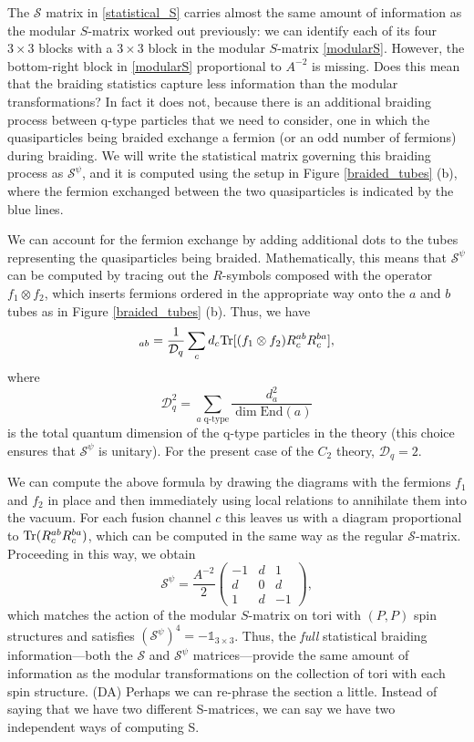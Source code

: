 \documentclass[12pt,a4paper]{article}
\newcommand{\tp}{\otimes}
\newcommand{\unit}{\mathds{1}}
\newcommand{\mcd}{\mathcal{D}}
\newcommand{\mcs}{\mathcal{S}}
\newcommand\be            {\begin{equation}}
\newcommand\ee            {\end{equation}}
\newcommand{\End}{\text{End}}
\newcommand{\dave}[1]{{\color{ao(english)}\footnotesize{(DA) #1}}}
\begin{document}
The $\mcs$ matrix in \eqref{statistical_S} carries almost the same amount of information as the modular $S$-matrix worked out previously: we can identify each of its four $3\times3$ blocks with a $3\times3$ block in the modular $S$-matrix \eqref{modularS}. 
However, the bottom-right block in \eqref{modularS} proportional to $A^{-2}$ is missing. Does this mean that the braiding statistics capture less information than the modular transformations? 
In fact it does not, because there is an additional braiding process between q-type particles that we need to consider, one in which the quasiparticles being braided exchange a fermion (or an odd number of fermions) during braiding. 
We will write the statistical matrix governing this braiding process as $\mcs^\psi$, and it is computed using the setup in Figure \ref{braided_tubes} (b), where the fermion exchanged between the two quasiparticles is indicated by the blue lines. 

We can account for the fermion exchange by adding additional dots to the tubes representing the quasiparticles being braided.
Mathematically, this means that $\mcs^\psi$ can be computed by tracing out the $R$-symbols composed with the operator $f_1\tp f_2$, which inserts fermions ordered in the appropriate way onto the $a$ and $b$ tubes as in Figure \ref{braided_tubes} (b). 
Thus, we have
\be [\mcs^\psi]_{ab} = \frac{1}{\mcd_{q}}\sum_cd_c{\rm Tr}[(f_1\tp f_2)R^{ab}_cR^{ba}_c], \ee
where 
\be \mcd^2_q = \sum_{a \text{\ q-type}}\frac{d_a^2}{\dim\End(a)}\ee
is the total quantum dimension of the q-type particles in the theory (this choice ensures that $\mcs^\psi$ is unitary). 
For the present case of the $C_2$ theory, $\mcd_q = 2$. 

We can compute the above formula by drawing the diagrams with the fermions $f_1$ and $f_2$ in place and then immediately using local relations to annihilate them into the vacuum.
For each fusion channel $c$ this leaves us with a diagram proportional to ${\rm Tr}(R^{ab}_cR^{ba}_c)$, which can be computed in the same way as the regular $\mcs$-matrix. 
Proceeding in this way, we obtain 
\be \mcs^\psi = \frac{A^{-2}}{2}\begin{pmatrix} -1 & d & 1 \\ d & 0 & d \\ 1 & d & -1\end{pmatrix},\ee
which matches the action of the modular $S$-matrix on tori with $(P,P)$ spin structures and satisfies $(\mcs^\psi)^4=-\unit_{3\times3}$. 
Thus, the {\it full} statistical braiding information---both the $\mcs$ and $\mcs^\psi$ matrices---provide the same amount of information as the modular transformations on the collection of tori with each spin structure. 
\dave{Perhaps we can re-phrase the section a little. 
Instead of saying that we have two different S-matrices, we can say we have two independent ways of computing S. }
\end{document}
